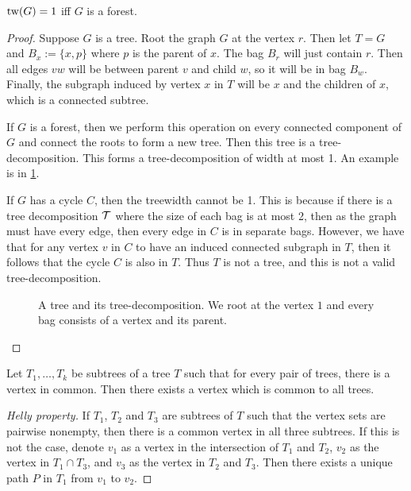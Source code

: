 \begin{lemma}\label{lem:treewidth_forest}
	\(\operatorname{tw}(G) = 1\) iff \(G\) is a forest.
\end{lemma}
\begin{proof}
	Suppose \(G\) is a tree. Root the graph \(G\) at the vertex \(r\). Then let \(T = G\) and \(B_x:= \lbrace x, p \rbrace\) where \(p\) is the parent of \(x\). The bag \(B_r\) will just contain \(r\). Then all edges \(vw\) will be between parent \(v\) and child \(w\), so it will be in bag \(B_w\). Finally, the subgraph induced by vertex \(x\) in \(T\) will be \(x\) and the children of \(x\), which is a connected subtree.
	\par
	If \(G\) is a forest, then we perform this operation on every connected component of \(G\) and connect the roots to form a new tree. Then this tree is a tree-decomposition. This forms a tree-decomposition of width at most 1. An example is in \cref{fig:tree-treedecomp}.
	\par
	If \(G\) has a cycle \(C\), then the treewidth cannot be 1. This is because if there is a tree decomposition \(\mathcal{T}\) where the size of each bag is at most 2, then as the graph must have every edge, then every edge in \(C\) is in separate bags. However, we have that for any vertex \(v\) in \(C\) to have an induced connected subgraph in \(T\), then it follows that the cycle \(C\) is also in \(T\). Thus \(T\) is not a tree, and this is not a valid tree-decomposition.
	\begin{figure}[ht]
		\centering
		
		
		\caption{A tree and its tree-decomposition. We root at the vertex \(1\) and every bag consists of a vertex and its parent.}
		\label{fig:tree-treedecomp}
	\end{figure}
\end{proof}

\begin{lemma}\label{lem:Helly}
	Let \(T_1, \ldots, T_k\) be subtrees of a tree \(T\) such that for every pair of trees, there is a vertex in common. Then there exists a vertex which is common to all trees.
\end{lemma}
\begin{proof}[Helly property]
	If \(T_1\), \(T_2\) and \(T_3\) are subtrees of \(T\) such that the vertex sets are pairwise nonempty, then there is a common vertex in all three subtrees. If this is not the case, denote \(v_1\) as a vertex in the intersection of \(T_1\) and \(T_2\), \(v_2\) as the vertex in \(T_1 \cap T_3\), and \(v_3\) as the vertex in \(T_2\) and \(T_3\). Then there exists a unique path \(P\) in \(T_1\) from \(v_1\) to \(v_2\).
\end{proof}

